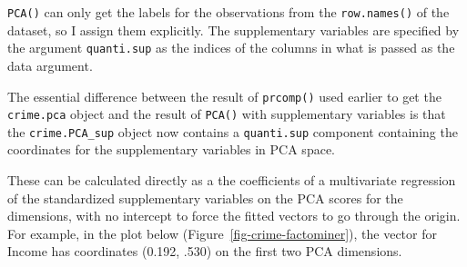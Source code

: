 \documentclass[
  letterpaper,
  10pt,
  krantz2]{krantz}
\makeatletter
\newenvironment{Shaded}{\begin{snugshade}}{\end{snugshade}}
\newcommand{\AttributeTok}[1]{\textcolor[rgb]{0.40,0.45,0.13}{#1}}
\newcommand{\ConstantTok}[1]{\textcolor[rgb]{0.56,0.35,0.01}{#1}}
\newcommand{\DecValTok}[1]{\textcolor[rgb]{0.68,0.00,0.00}{#1}}
\newcommand{\FunctionTok}[1]{\textcolor[rgb]{0.28,0.35,0.67}{#1}}
\newcommand{\NormalTok}[1]{\textcolor[rgb]{0.00,0.23,0.31}{#1}}
\newcommand{\OtherTok}[1]{\textcolor[rgb]{0.00,0.23,0.31}{#1}}
\newcommand{\SpecialCharTok}[1]{\textcolor[rgb]{0.37,0.37,0.37}{#1}}
\newenvironment{kframe}{%
  \medskip{}
  \setlength{\fboxsep}{.8em}
  \def\at@end@of@kframe{}%
  \ifinner\ifhmode%
  \def\at@end@of@kframe{\end{minipage}}%
  \begin{minipage}{\columnwidth}%
  \fi\fi%
  \def\FrameCommand##1{\hskip\@totalleftmargin \hskip-\fboxsep
  \colorbox{shadecolor}{##1}\hskip-\fboxsep
      \hskip-\linewidth \hskip-\@totalleftmargin \hskip\columnwidth}%
  \MakeFramed {\advance\hsize-\width
    \@totalleftmargin\z@ \linewidth\hsize
    \@setminipage}}%
{\par\unskip\endMakeFramed%
  \at@end@of@kframe}
\renewenvironment{Shaded}{\begin{kframe}}{\end{kframe}}
\makeatother
\begin{document}
\texttt{PCA()} can only get the labels for the observations from the
\texttt{row.names()} of the dataset, so I assign them explicitly. The
supplementary variables are specified by the argument
\texttt{quanti.sup} as the indices of the columns in what is passed as
the data argument.

\begin{Shaded}
\end{Shaded}

The essential difference between the result of \texttt{prcomp()} used
earlier to get the \texttt{crime.pca} object and the result of
\texttt{PCA()} with supplementary variables is that the
\texttt{crime.PCA\_sup} object now contains a \texttt{quanti.sup}
component containing the coordinates for the supplementary variables in
PCA space.

These can be calculated directly as a the coefficients of a multivariate
regression of the standardized supplementary variables on the PCA scores
for the dimensions, with no intercept to force the fitted vectors to go
through the origin. For example, in the plot below
(Figure~\ref{fig-crime-factominer}), the vector for Income has
coordinates (0.192, .530) on the first two PCA dimensions.
\end{document}
